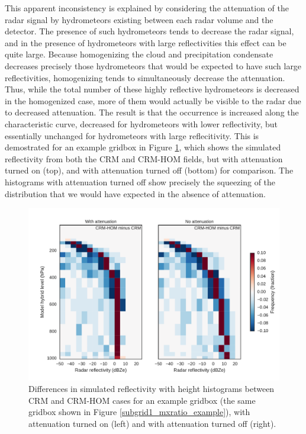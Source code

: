 This apparent inconsistency is explained by considering the attenuation of the radar signal by hydrometeors existing between each radar volume and the detector. The presence of such hydrometeors tends to decrease the radar signal, and in the presence of hydrometeors with large reflectivities this effect can be quite large. Because homogenizing the cloud and precipitation condensate decreases precisely those hydrometeors that would be expected to have such large reflectivities, homogenizing tends to simultaneously decrease the attenuation. Thus, while the total number of these highly reflective hydrometeors is decreased in the homogenized case, more of them would actually be visible to the radar due to decreased attenuation. The result is that the occurrence is increased along the characteristic curve, decreased for hydrometeors with lower reflectivity, but essentially unchanged for hydrometeors with large reflecitivity. This is demostrated for an example gridbox in Figure \ref{sg_cfadDbze94_testatt}, which shows the simulated reflectivity from both the CRM and CRM-HOM fields, but with attenuation turned on (top), and with attenuation turned off (bottom) for comparison. The histograms with attenuation turned off show precisely the squeezing of the distribution that we would have expected in the absence of attenuation.

\begin{figure}
\centering
\includegraphics[width=\columnwidth]{graphics/subgrid1_cfadDbze94_att-test.pdf}
\caption{Differences in simulated reflectivity with height histograms between CRM and CRM-HOM cases for an example gridbox (the same gridbox shown in Figure \ref{subgrid1_mxratio_example}), with attenuation turned on (left) and with attenuation turned off (right).}
\label{sg_cfadDbze94_testatt}
\end{figure}

